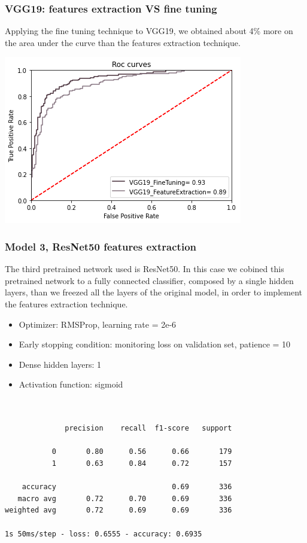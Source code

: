 \documentclass{article}
\begin{document}
\subsubsection{VGG19: features extraction VS fine tuning}
Applying the fine tuning technique to VGG19, we obtained about 4\% more on the area under the curve than the features extraction technique.
\begin{center}
\begin{minipage}{0.45\textwidth}
        \includegraphics[scale=0.6]{./img/rocVGG19.png}
    \end{minipage}
\end{center}






\subsubsection{Model 3, ResNet50 features extraction}
The third pretrained network used is ResNet50. In this case we cobined this pretrained network to a fully connected classifier, composed by a single hidden layers, than we freezed all the layers of the original model, in order to implement the features extraction technique.

\begin{itemize}
\item Optimizer: RMSProp, learning rate = 2e-6
\item Early stopping condition: monitoring loss on validation set, patience = 10
\item Dense hidden layers: 1
\item Activation function: sigmoid
\end{itemize}

\begin{verbatim}


              precision    recall  f1-score   support

           0       0.80      0.56      0.66       179
           1       0.63      0.84      0.72       157

    accuracy                           0.69       336
   macro avg       0.72      0.70      0.69       336
weighted avg       0.72      0.69      0.69       336

1s 50ms/step - loss: 0.6555 - accuracy: 0.6935

\end{verbatim}
\end{document}
